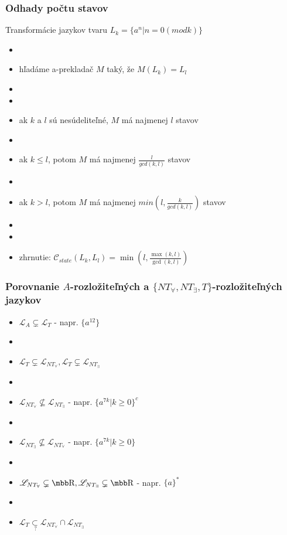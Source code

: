 \documentclass[slovak]{beamer}
\begin{document}
\begin{frame}
\frametitle{Odhady počtu stavov}

Transformácie jazykov tvaru $L_{k} = \{ a^n| n = 0 (mod k)\} $
\begin{itemize}
\item[]
\item hľadáme a-prekladač $M$ taký, že $M(L_{k}) = L_{l}$
\item[]
\item[]
\item ak $k$ a $l$ sú nesúdeliteľné, $M$ má najmenej $l$ stavov
\item[]
\item ak $k \leq l$, potom $M$ má najmenej $\frac{l}{gcd(k,l)}$ stavov 
\item[]
\item ak $k > l$, potom $M$ má najmenej $min(l, \frac{k}{gcd(k,l)})$ stavov
\item[]
\item[]
\item zhrnutie: $\mathcal{C}_{state}(L_k, L_l) = \min (l, \frac{\max (k,l)}{\gcd (k,l)})$
\end{itemize}

\end{frame}

\begin{frame}
\frametitle{Porovnanie $A$-rozložiteľných a $\{NT_{\forall}, NT_{\exists}, T\}$-rozložiteľných jazykov}

\begin{itemize}
\item $\mathscr{L}_{A} \subsetneq \mathscr{L}_{T}$ - napr. $\{a^{12}\}$
\item[]
\item $\mathscr{L}_{T} \subsetneq \mathscr{L}_{NT_{\forall}}, \mathscr{L}_{T} \subsetneq \mathscr{L}_{NT_{\exists}}$
\item[]
\item $\mathscr{L}_{NT_{\forall}} \not \subseteq \mathscr{L}_{NT_{\exists}}$ - napr. $\{ a^{7k} | k \geq 0 \}^c$
\item[]
\item $\mathscr{L}_{NT_{\exists}} \not \subseteq \mathscr{L}_{NT_{\forall}}$ - napr. $\{ a^{7k} | k \geq 0 \}$
\item[]
\item $\mathscr{L}_{NT_{\forall}} \subsetneq \R, \mathscr{L}_{NT_{\exists}} \subsetneq \R$ - napr. $\{a\}^*$
\item[]
\item $\mathscr{L}_{T} \underset{\ ?}{\subset} \mathscr{L}_{NT_{\forall}} \cap \mathscr{L}_{NT_{\exists}}$
\end{itemize}

\end{frame}
\end{document}
